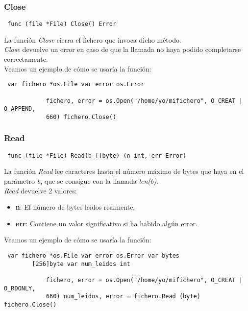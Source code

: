 		\subsubsection{Close}
		
		\begin{verbatim} func (file *File) Close() Error \end{verbatim}
		
		La función \textit{Close} cierra el fichero que invoca dicho método.\\
		
		\textit{Close} devuelve un error en caso de que la llamada no haya
		podido completarse correctamente.\\
		
		Veamos un ejemplo de cómo se usaría la función:
		
		\begin{verbatim} var fichero *os.File var error os.Error
		    
			fichero, error = os.Open("/home/yo/mifichero", O_CREAT | O_APPEND,
			660) fichero.Close() \end{verbatim}
		
		\subsubsection{Read}
		
		\begin{verbatim} func (file *File) Read(b []byte) (n int, err Error)
		\end{verbatim}
		
		La función \textit{Read} lee caracteres hasta el número máximo de bytes
		que haya en el parámetro \textit{b}, que se consigue con la llamada
		\textit{len(b)}.\\
		
		\textit{Read} devuelve 2 valores: \begin{itemize} \item \textbf{n}: El
		número de bytes leídos realmente.  \item \textbf{err}: Contiene un valor
		significativo si ha habido algún error.  \end{itemize}
		
		Veamos un ejemplo de cómo se usaría la función:
		
		\begin{verbatim} var fichero *os.File var error os.Error var bytes
		[256]byte var num_leidos int
		    
			fichero, error = os.Open("/home/yo/mifichero", O_CREAT | O_RDONLY,
			660) num_leidos, error = fichero.Read (byte) fichero.Close()
			\end{verbatim}
		
